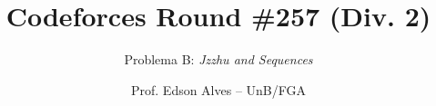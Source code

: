 \title{Codeforces Round \#257 (Div. 2)}
\subtitle{Problema B: \it Jzzhu and Sequences}
\author{Prof. Edson Alves -- UnB/FGA}
\date{}
